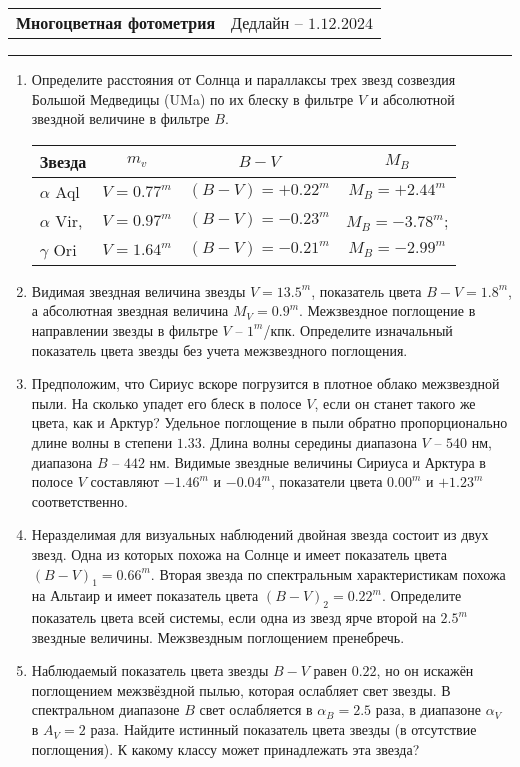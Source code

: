 \documentclass[12pt]{article}
\begin{document}
 \begin{tabularx}{\textwidth}{Xr}
  {\Large \textbf{Многоцветная фотометрия}} & Дедлайн -- $1.12.2024$ \\
 \end{tabularx}
 \noindent\rule{\textwidth}{0.4pt}
 \begin{enumerate}
    \item Определите расстояния от Солнца и параллаксы трех звезд созвездия Большой Медведицы (UMa) по их блеску в фильтре $V$ и абсолютной звездной величине в фильтре $B$.
    
    \begin{center}
        \begin{tabular}[t]{|l|c|c|c|}
            \hline
            \hline
        Звезда &  $m_v$ & $B-V$ & $M_B$\\
        \hline
        $\alpha$ Aql & $V=0.77^m$ & $(B-V) = + 0.22^m$ & $M_B=+2.44^m$\\
        \hline
        $\alpha$ Vir, & $V=0.97^m$ & $(B-V) = - 0.23^m$ & $M_B=- 3.78^m$; \\
        \hline 
        $\gamma$ Ori & $V= 1.64^m$ & $(B-V)= -0.21^m$ & $M_B=- 2.99^m$ \\
            \hline
            \hline 
        \end{tabular}
        \end{center}
    \item Видимая звездная величина звезды $V=13.5^m$, показатель цвета $B-V=1.8^m$, а абсолютная звездная величина $M_V=0.9^m$. Межзвездное поглощение в направлении звезды в фильтре $V$ -- $1^m$/кпк. Определите изначальный показатель цвета звезды без учета межзвездного поглощения.
    \item Предположим, что Сириус вскоре погрузится в плотное облако межзвездной пыли. На сколько упадет его блеск в полосе $V$, если он станет такого же цвета, как и Арктур? Удельное поглощение в пыли обратно пропорционально длине волны в степени $1.33$. Длина волны середины диапазона $V$ -- $540$ нм, диапазона $B$ -- $442$ нм. Видимые звездные величины Сириуса и Арктура в полосе $V$ составляют $-1.46^m$ и $-0.04^m$, показатели цвета $0.00^m$ и $+1.23^m$ соответственно.
    \item Неразделимая для визуальных наблюдений двойная звезда состоит из двух звезд. Одна из которых похожа на Солнце и имеет показатель цвета $(B-V)_{1}=0.66^m$. Вторая звезда по спектральным характеристикам похожа на Альтаир и имеет показатель цвета $(B-V)_{2}=0.22^m$. Определите показатель цвета всей системы, если одна из звезд ярче второй на $2.5^m$ звездные величины. Межзвездным поглощением пренебречь. 
    \item Наблюдаемый показатель цвета звезды $B-V$ равен $0.22$, но он искажён поглощением межзвёздной пылью, которая ослабляет свет звезды. В спектральном диапазоне $B$ свет ослабляется в $\alpha_B=2.5$ раза, в диапазоне $\alpha_V$ в $A_V=2$ раза. Найдите истинный показатель цвета звезды (в отсутствие поглощения). К какому классу может принадлежать эта звезда?
 \end{enumerate}
\end{document}
